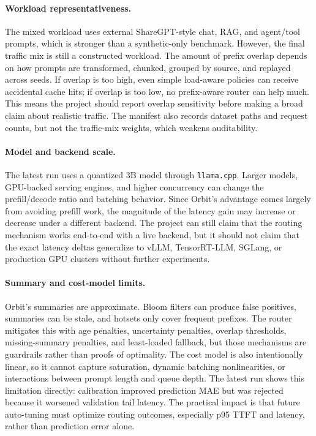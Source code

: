 \documentclass[10pt,twocolumn]{article}
\begin{document}
\paragraph{Workload representativeness.}
The mixed workload uses external ShareGPT-style chat, RAG, and agent/tool prompts, which is stronger than a synthetic-only benchmark. However, the final traffic mix is still a constructed workload. The amount of prefix overlap depends on how prompts are transformed, chunked, grouped by source, and replayed across seeds. If overlap is too high, even simple load-aware policies can receive accidental cache hits; if overlap is too low, no prefix-aware router can help much. This means the project should report overlap sensitivity before making a broad claim about realistic traffic. The manifest also records dataset paths and request counts, but not the traffic-mix weights, which weakens auditability.

\paragraph{Model and backend scale.}
The latest run uses a quantized 3B model through \texttt{llama.cpp}. Larger models, GPU-backed serving engines, and higher concurrency can change the prefill/decode ratio and batching behavior. Since Orbit's advantage comes largely from avoiding prefill work, the magnitude of the latency gain may increase or decrease under a different backend. The project can still claim that the routing mechanism works end-to-end with a live backend, but it should not claim that the exact latency deltas generalize to vLLM, TensorRT-LLM, SGLang, or production GPU clusters without further experiments.

\paragraph{Summary and cost-model limits.}
Orbit's summaries are approximate. Bloom filters can produce false positives, summaries can be stale, and hotsets only cover frequent prefixes. The router mitigates this with age penalties, uncertainty penalties, overlap thresholds, missing-summary penalties, and least-loaded fallback, but those mechanisms are guardrails rather than proofs of optimality. The cost model is also intentionally linear, so it cannot capture saturation, dynamic batching nonlinearities, or interactions between prompt length and queue depth. The latest run shows this limitation directly: calibration improved prediction MAE but was rejected because it worsened validation tail latency. The practical impact is that future auto-tuning must optimize routing outcomes, especially p95 TTFT and latency, rather than prediction error alone.
\end{document}
